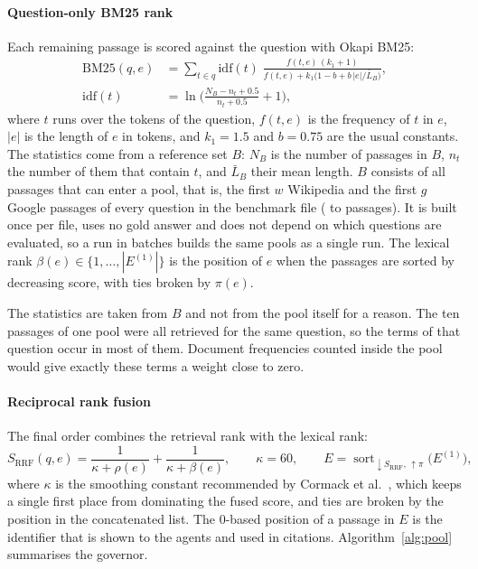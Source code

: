 \paragraph{Question-only BM25 rank}
Each remaining passage is scored against the question with Okapi BM25:
\begin{equation}
\begin{aligned}
\mathrm{BM25}(q,e) &= \sum_{t\in q} \mathrm{idf}(t)\;
\frac{f(t,e)\,(k_1+1)}{f(t,e)+k_1\big(1-b+b\,|e|/\bar L_B\big)},\\
\mathrm{idf}(t) &= \ln\!\Big(\frac{N_B-n_t+0.5}{n_t+0.5}+1\Big),
\end{aligned}
\label{eq:bm25}
\end{equation}
where $t$ runs over the tokens of the question, $f(t,e)$ is the frequency of $t$ in $e$, $|e|$ is the length of $e$ in tokens, and $k_1=1.5$ and $b=0.75$ are the usual constants. The statistics come from a reference set $B$: $N_B$ is the number of passages in $B$, $n_t$ the number of them that contain $t$, and $\bar L_B$ their mean length. $B$ consists of all passages that can enter a pool, that is, the first $w$ Wikipedia and the first $g$ Google passages of every question in the benchmark file (\VIndexNMin{} to \VIndexNMax{} passages). It is built once per file, uses no gold answer and does not depend on which questions are evaluated, so a run in batches builds the same pools as a single run. The lexical rank $\beta(e)\in\{1,\dots,|E^{(1)}|\}$ is the position of $e$ when the passages are sorted by decreasing score, with ties broken by $\pi(e)$.

The statistics are taken from $B$ and not from the pool itself for a reason. The ten passages of one pool were all retrieved for the same question, so the terms of that question occur in most of them. Document frequencies counted inside the pool would give exactly these terms a weight close to zero.

\paragraph{Reciprocal rank fusion}
The final order combines the retrieval rank with the lexical rank:
\begin{equation}
S_{\mathrm{RRF}}(q,e) = \frac{1}{\kappa+\rho(e)} + \frac{1}{\kappa+\beta(e)}, \qquad \kappa = 60, \qquad
E = \operatorname{sort}_{\downarrow S_{\mathrm{RRF}},\,\uparrow \pi}\big(E^{(1)}\big),
\label{eq:rrf}
\end{equation}
where $\kappa$ is the smoothing constant recommended by Cormack et al.~\cite{cormack2009rrf}, which keeps a single first place from dominating the fused score, and ties are broken by the position in the concatenated list. The 0-based position of a passage in $E$ is the identifier that is shown to the agents and used in citations. Algorithm~\ref{alg:pool} summarises the governor.

